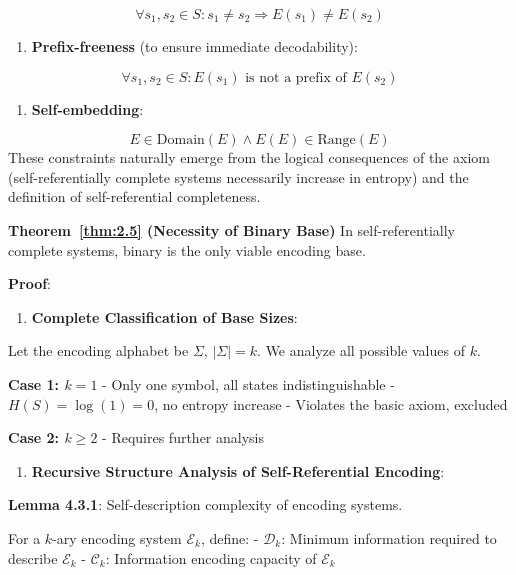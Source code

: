 \begin{equation}
\forall s_1, s_2 \in S: s_1 \neq s_2 \Rightarrow E(s_1) \neq E(s_2)
\end{equation}
\begin{enumerate}
\item \textbf{Prefix-freeness} (to ensure immediate decodability):
\end{enumerate}
   
\begin{equation}
\forall s_1, s_2 \in S: E(s_1) \text{ is not a prefix of } E(s_2)
\end{equation}
\begin{enumerate}
\item \textbf{Self-embedding}:
\end{enumerate}
   
\begin{equation}
E \in \text{Domain}(E) \land E(E) \in \text{Range}(E)
\end{equation}
These constraints naturally emerge from the logical consequences of the axiom (self-referentially complete systems necessarily increase in entropy) and the definition of self-referential completeness.

\textbf{Theorem~\ref{thm:2.5} (Necessity of Binary Base)}
\label{thm:2.5}
In self-referentially complete systems, binary is the only viable encoding base.

\textbf{Proof}:

\begin{enumerate}
\item \textbf{Complete Classification of Base Sizes}:
\end{enumerate}
   Let the encoding alphabet be $\Sigma$, $|\Sigma| = k$. We analyze all possible values of $k$.
   
   \textbf{Case 1: $k = 1$}
   - Only one symbol, all states indistinguishable
   - $H(S) = \log(1) = 0$, no entropy increase
   - Violates the basic axiom, excluded
   
   \textbf{Case 2: $k \geq 2$}
   - Requires further analysis
   
\begin{enumerate}
\item \textbf{Recursive Structure Analysis of Self-Referential Encoding}:
\end{enumerate}
   
   \textbf{Lemma 4.3.1}: Self-description complexity of encoding systems.
\label{thm:2.5}
   
   For a $k$-ary encoding system $\mathcal{E}_k$, define:
   - $\mathcal{D}_k$: Minimum information required to describe $\mathcal{E}_k$
   - $\mathcal{C}_k$: Information encoding capacity of $\mathcal{E}_k$
   
